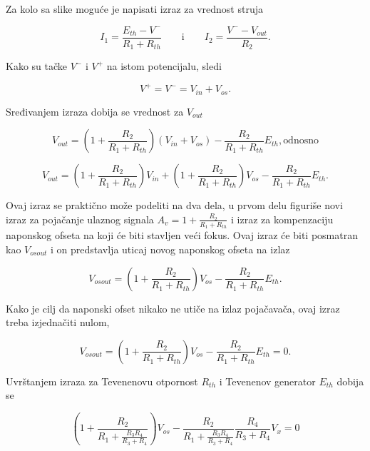 {Za kolo sa slike moguće je napisati izraz za vrednost struja}

\begin{equation}
    I_1 = \frac{E_{th} - V^-}{R_1 + R_{th}}
    \qquad \text{i} \qquad
    I_2 = \frac{V^- - V_{out}}{R_2}.
\end{equation}

{Kako su tačke $V^-$ i $V^+$ na istom potencijalu, sledi}

\begin{equation}
    V^+ = V^- = V_{in} + V_{os}.
\end{equation}

{Sređivanjem izraza dobija se vrednost za $V_{out}$}

\begin{equation}
    V_{out} = (1 + \frac{R_2}{R_1 + R_{th}})(V_{in} + V_{os}) - \frac{R_2}{R_1 + R_{th}}E_{th}, \text{odnosno}
\end{equation}

\begin{equation}
    V_{out} = (1 + \frac{R_2}{R_1 + R_{th}})V_{in} + (1 + \frac{R_2}{R_1 + R_{th}})V_{os} - \frac{R_2}{R_1 + R_{th}}E_{th}.
\end{equation}

{Ovaj izraz se praktično može podeliti na dva dela, u prvom delu figuriše novi izraz za pojačanje ulaznog signala $A_{v} = 1 + \frac{R_2}{R_1 + R_{th}}$ i izraz za kompenzaciju naponskog ofseta na koji će biti stavljen veći fokus. Ovaj izraz će biti posmatran kao $V_{osout}$ i on predstavlja uticaj novog naponskog ofseta na izlaz}

\begin{equation}
    V_{osout} = (1 + \frac{R_2}{R_1 + R_{th}})V_{os} - \frac{R_2}{R_1 + R_{th}}E_{th}.
\end{equation}

{Kako je cilj da naponski ofset nikako ne utiče na izlaz pojačavača, ovaj izraz treba izjednačiti nulom,}

\begin{equation}
    V_{osout} = (1 + \frac{R_2}{R_1 + R_{th}})V_{os} - \frac{R_2}{R_1 + R_{th}}E_{th} = 0.
\end{equation}

{Uvrštanjem izraza za Tevenenovu otpornost $R_{th}$ i Tevenenov generator $E_{th}$ dobija se}

\begin{equation}
    (1 + \frac{R_2}{R_1 + \frac{R_3R_4}{R_3 + R_4}})V_{os} - \frac{R_2}{R_1 + \frac{R_3R_4}{R_3 + R_4}}\frac{R_4}{R_3 + R_4}V_{x} = 0
\end{equation}

